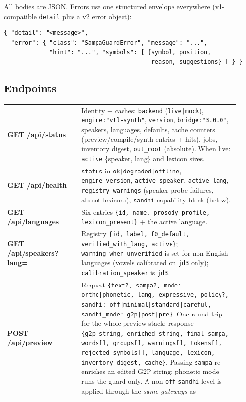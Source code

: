 \documentclass[11pt,a4paper]{article}
\begin{document}
All bodies are JSON. Errors use one structured envelope everywhere
(v1-compatible \texttt{detail} plus a v2 error object):

\begin{verbatim}
{ "detail": "<message>",
  "error": { "class": "SampaGuardError", "message": "...",
             "hint": "...", "symbols": [ {symbol, position,
                                          reason, suggestions} ] } }
\end{verbatim}

\subsection{Endpoints}

\begin{longtable}{p{0.30\linewidth}p{0.64\linewidth}}
\textbf{GET /api/status} & Identity + caches: \texttt{backend}
(\texttt{live|mock}), \texttt{engine:"vtl-synth"}, \texttt{version},
\texttt{bridge:"3.0.0"}, speakers, languages, defaults, cache counters
(preview/compile/synth entries + hits), jobs, inventory digest,
\texttt{out\_root} (absolute). When live: \texttt{active}
\{speaker, lang\} and lexicon sizes. \\
\textbf{GET /api/health} & \texttt{status} in
\texttt{ok|degraded|offline}, \texttt{engine\_version},
\texttt{active\_speaker}, \texttt{active\_lang},
\texttt{registry\_warnings} (speaker probe failures, absent lexicons),
\texttt{sandhi} capability block (below). \\
\textbf{GET /api/languages} & Six entries
\texttt{\{id, name, prosody\_profile, lexicon\_present\}} + the active
language. \\
\textbf{GET /api/speakers?lang=} & Registry
\texttt{\{id, label, f0\_default, verified\_with\_lang, active\}};
\texttt{warning\_when\_unverified} is set for non-English languages
(vowels calibrated on \texttt{jd3} only); \texttt{calibration\_speaker}
is \texttt{jd3}. \\
\textbf{POST /api/preview} & Request
\texttt{\{text?, sampa?, mode: ortho|phonetic, lang, expressive,
policy?, sandhi: off|minimal|standard|careful, sandhi\_mode:
g2p|post|pre\}}. One round trip for the whole preview stack: response
\texttt{\{g2p\_string, enriched\_string, final\_sampa, words[], groups[],
warnings[], tokens[], rejected\_symbols[], language, lexicon,
inventory\_digest, cache\}}. Passing \texttt{sampa} re-enriches an edited
G2P string; phonetic mode runs the guard only. A non-\texttt{off}
\texttt{sandhi} level is applied through the \emph{same gateways} as

\end{longtable}
\end{document}
